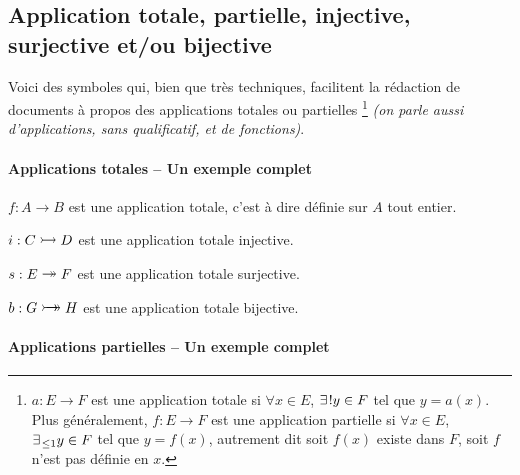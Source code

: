 \documentclass[12pt,a4paper]{article}
\theoremstyle{definition}
\begin{document}



\bigskip










\subsection{Application totale, partielle, injective, surjective et/ou bijective} \label{section:application}

Voici des symboles qui, bien que très techniques, facilitent la rédaction de documents à propos des applications totales ou partielles
\footnote{
	$a: E \to F$ est une application totale si $\forall x \in E$, $\exists\kern0.1em ! y \in F$ tel que $y = a(x)$. 
	Plus généralement, $f: E \to F$ est une application partielle si $\forall x \in E$, $\exists_{\kern0.1em \leq 1} y \in F$ tel que $y = f(x)$, autrement dit soit $f(x)$ existe dans $F$, soit $f$ n'est pas définie en $x$.
}
\emph{(on parle aussi d'applications, sans qualificatif, et de fonctions)}.



\paragraph{Applications totales -- Un exemple complet}

\begin{tcblisting}{}
$f: A \to B$ est une application totale, c'est à dire définie sur $A$ tout entier.

$i: C \onetoone D$ est une application totale injective.

$s: E \onto F$ est une application totale surjective.

$b: G \biject H$ est une application totale bijective.
\end{tcblisting}



\paragraph{Applications partielles -- Un exemple complet}
\end{document}
